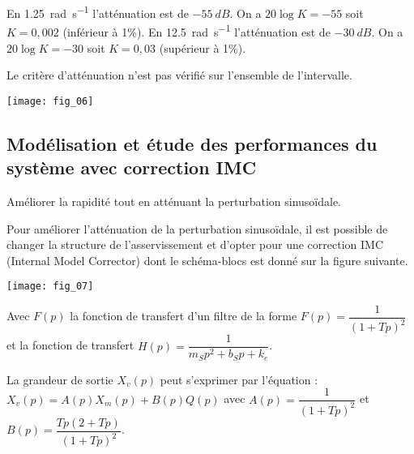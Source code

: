 \ifprof
\begin{corrige}
En \SI{1,25}{rad.s^{-1}} l'atténuation est de $\SI{-55}{dB}$. On a $20\log K = -55$ soit $K=0,002$ (inférieur à 1\%). 
En \SI{12,5}{rad.s^{-1}} l'atténuation est de $\SI{-30}{dB}$. On a $20\log K = -30$ soit $K=0,03$ (supérieur à 1\%). 

Le critère d'atténuation n'est pas vérifié sur l'ensemble de l'intervalle.
\end{corrige}
\else
\fi



\begin{marginfigure}
\texttt{[image: fig\_06]}
\end{marginfigure}



\subsection*{Modélisation et étude des performances du système avec correction IMC}

\begin{obj}
Améliorer la rapidité tout en atténuant la perturbation sinusoïdale.
\end{obj}

Pour améliorer l’atténuation de la perturbation sinusoïdale, il est possible de changer la
structure de l’asservissement et d’opter pour une correction IMC (Internal Model Corrector)
dont le schéma-blocs est donné sur la figure suivante.

\begin{marginfigure}
\texttt{[image: fig\_07]}
\end{marginfigure}

Avec $F(p)$ la fonction de transfert d’un filtre de la forme $F(p) = \dfrac{1}{\left(1+Tp\right)^2}$ et la fonction de
transfert $H(p) =\dfrac{1}{m_S p^2 + b_S p + k_e}$.



La grandeur de sortie $X_v(p)$ peut s’exprimer par l’équation : $X_v(p) = A(p)X_m(p) + B(p)Q(p)$ avec 
$A(p) = \dfrac{1}{\left(1+Tp\right)^2}$ et $B(p)=\dfrac{Tp\left(2+Tp \right)}{\left(1+Tp\right)^2}$.



